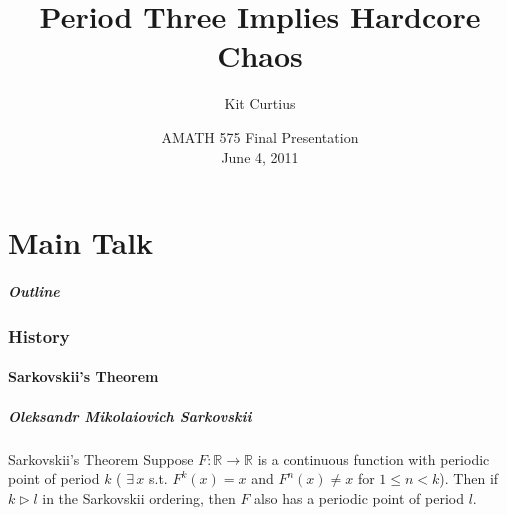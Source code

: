 \documentclass[notes]{beamer}
\title{Period Three Implies Hardcore Chaos}
\author[Curtius]{
Kit Curtius \inst{1}
}
\institute[]{
\inst{1}
University of Washington, Applied Mathematics, USA
}
\date[AMath 2011]{AMATH 575 Final Presentation\\
June 4, 2011}
\begin{document}
\frame{\titlepage}

\part<presentation>{Main Talk}

\begin{frame}
  \frametitle{Outline}
    \tableofcontents
\end{frame}


\section[History]{History}
\subsection[Sarkovskii's Theorem]{Sarkovskii's Theorem}

\begin{frame}
 \frametitle{Oleksandr Mikolaiovich Sarkovskii}
{\footnotesize
{}
}
\begin{block}{ Sarkovskii's Theorem}
Suppose $ F: \mathbb{R} \longrightarrow\mathbb{R}$ is a continuous function with periodic point of period $k$ ( $\exists \, x $ s.t. $F^k(x) = x$ and $F^n(x)\neq x$ for $1 \leq n < k$).
Then if $k \rhd l$ in the Sarkovskii ordering, then $F$ also has a periodic point of period $l$. 
\end{block}

\end{frame}
\end{document}

